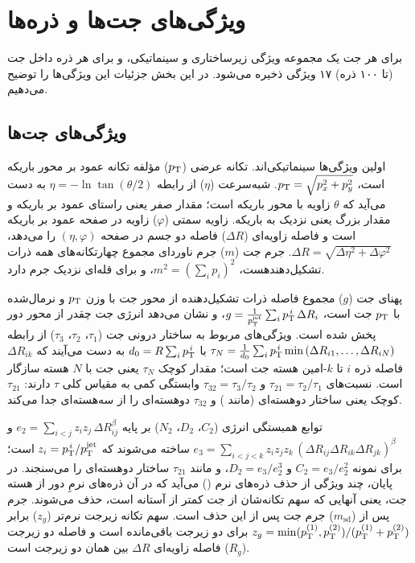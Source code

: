 \section{ویژگی‌های جت‌ها و ذره‌ها}
\label{sec:vars}
برای هر جت یک مجموعه ویژگی زیرساختاری و سینماتیکی، و برای هر ذره داخل جت (تا ۱۰۰ ذره) ۱۷ ویژگی ذخیره می‌شود. در این بخش جزئیات این ویژگی‌ها را توضیح می‌دهیم.

\subsection{ویژگی‌های جت‌ها}
اولین ویژگی‌ها سینماتیکی‌اند. تکانه عرضی ($p_\mathrm{T}$) مؤلفه تکانه عمود بر محور باریکه است، $p_\mathrm{T}=\sqrt{p_x^2+p_y^2}$. شبه‌سرعت ($\eta$) از رابطه $\eta=-\ln\tan(\theta/2)$ به دست می‌آید که $\theta$ زاویه با محور باریکه است؛ مقدار صفر یعنی راستای عمود بر باریکه و مقدار بزرگ یعنی نزدیک به باریکه. زاویه سمتی ($\varphi$) زاویه در صفحه عمود بر باریکه است و فاصله زاویه‌ای ($\Delta R$) فاصله دو جسم در صفحه $(\eta,\varphi)$ را می‌دهد، $\Delta R=\sqrt{\Delta\eta^2+\Delta\varphi^2}$. جرم جت ($m$) جرم ناوردای مجموع چهارتکانه‌های همه ذرات تشکیل‌دهندهست، $m^2=\left(\sum_i p_i\right)^2$، و برای \Zbb قله‌ای نزدیک جرم \Zbos{} دارد.

پهنای جت ($g$) مجموع فاصله ذرات تشکیل‌دهنده از محور جت با وزن $p_\mathrm{T}$ و نرمال‌شده با $p_\mathrm{T}$ جت است، $g=\frac{1}{p_\mathrm{T}^{\mathrm{jet}}}\sum_i p_\mathrm{T}^{\,i}\,\Delta R_{i}$، و نشان می‌دهد انرژی جت چقدر از محور دور پخش شده است. ویژگی‌های مربوط به ساختار درونی جت ($\tau_1$، $\tau_2$، $\tau_3$) از رابطه $\tau_N=\frac{1}{d_0}\sum_i p_\mathrm{T}^{\,i}\min\left(\Delta R_{i1},\dots,\Delta R_{iN}\right)$ با $d_0=R\sum_ip_\mathrm{T}^{\,i}$ به دست می‌آیند که $\Delta R_{ik}$ فاصله ذره $i$ تا $k$-امین هسته جت است؛ مقدار کوچک $\tau_N$ یعنی جت با $N$ هسته سازگار است. نسبت‌های $\tau_{21}=\tau_2/\tau_1$ و $\tau_{32}=\tau_3/\tau_2$ وابستگی کمی به مقیاس کلی $\tau$ دارند: $\tau_{21}$ کوچک یعنی ساختار دو‌هسته‌ای (مانند \Zbb) و $\tau_{32}$ دو‌هسته‌ای را از سه‌هسته‌ای جدا می‌کند.

توابع همبستگی انرژی ($C_2$، $D_2$، $N_2$) بر پایه $e_2=\sum_{i<j} z_i z_j\,\Delta R_{ij}^{\beta}$ و $e_3=\sum_{i<j<k} z_i z_j z_k\,(\Delta R_{ij}\Delta R_{ik}\Delta R_{jk})^{\beta}$ ساخته می‌شوند که $z_i=p_\mathrm{T}^{\,i}/p_\mathrm{T}^{\mathrm{jet}}$ است؛ برای نمونه $C_2=e_3/e_2^2$ و $D_2=e_3/e_2^3$، و مانند $\tau_{21}$ ساختار دو‌هسته‌ای را می‌سنجند. در پایان، چند ویژگی از حذف ذره‌های نرم () می‌آید که در آن ذره‌های نرمِ دور از هسته جت، یعنی آنهایی که سهم تکانه‌شان از جت کمتر از آستانه است، حذف می‌شوند. جرم پس از  ($m_\mathrm{sd}$) جرم جت پس از این حذف است. سهم تکانه زیرجت نرم‌تر ($z_g$) برابر $z_g=\min(p_\mathrm{T}^{(1)},p_\mathrm{T}^{(2)})/(p_\mathrm{T}^{(1)}+p_\mathrm{T}^{(2)})$ برای دو زیرجت باقی‌مانده است و فاصله دو زیرجت ($R_g$) فاصله زاویه‌ای $\Delta R$ بین همان دو زیرجت است.

